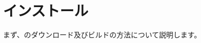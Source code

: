 \newpage
\section{インストール}
\label{sec:Install}
\parindent=0pt

まず、\SprLib のダウンロード及びビルドの方法について説明します。

